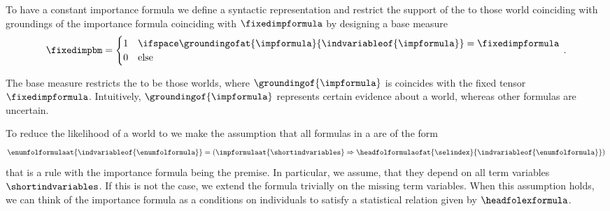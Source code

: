 To have a constant importance formula we define a syntactic representation and restrict the support of the \HybridFOLNetwork{} to those world coinciding with groundings of the importance formula coinciding with $\fixedimpformula$ by designing a base measure
\begin{align*}
    \fixedimpbm
    = \begin{cases}
          1 & \ifspace \groundingofat{\impformula}{\indvariableof{\impformula}} = \fixedimpformula \\
          0 & \text{else}
    \end{cases} \, .
\end{align*}

The base measure restricts the \HybridFOLNetwork{} to be those worlds, where $\groundingof{\impformula}$ is coincides with the fixed tensor $\fixedimpformula$.
Intuitively, $\groundingof{\impformula}$ represents certain evidence about a \firstOrderLogic{} world, whereas other formulas are uncertain.






To reduce the likelihood of a world to we make the assumption that all formulas in a \HybridFOLNetwork{} are of the form
\begin{align}
    \label{eq:folImplicationForm}
    \enumfolformulaat{\indvariableof{\enumfolformula}}
    = \left( \impformulaat{\shortindvariables} \Rightarrow \headfolformulaofat{\selindex}{\indvariableof{\enumfolformula}} \right)
\end{align}
that is a rule with the importance formula being the premise.
In particular, we assume, that they depend on all term variables $\shortindvariables$.
If this is not the case, we extend the formula trivially on the missing term variables.
When this assumption holds, we can think of the importance formula as a conditions on individuals to satisfy a statistical relation given by $\headfolexformula$.

